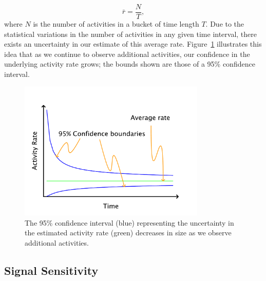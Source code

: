 \documentclass{article}
\begin{document}
\begin{equation}
    \label{eq:rateEst}
    \bar{r} = \frac{N}{T},
\end{equation}
where $N$ is the number of activities in a bucket of time length $T$. Due to the statistical
variations in the number of activities in any given time interval, there exists an uncertainty in our 
estimate of this average rate. Figure~\ref{fig:confidence} illustrates this idea that as we continue to 
observe additional activities, our confidence in the underlying activity rate grows; the bounds shown 
are those of a 95\% confidence interval.



%
\begin{figure}[h]
	\begin{center}
		\includegraphics[width=3.5in]{./imgs/fig2.pdf}
	\end{center}
	\caption{The 95\% confidence interval (blue) representing the uncertainty in the estimated activity rate (green) decreases in size as we observe additional activities. }
    	\label{fig:confidence}
\end{figure}
%
%

%


\subsection{Signal Sensitivity}
\label{sens}
\end{document}
